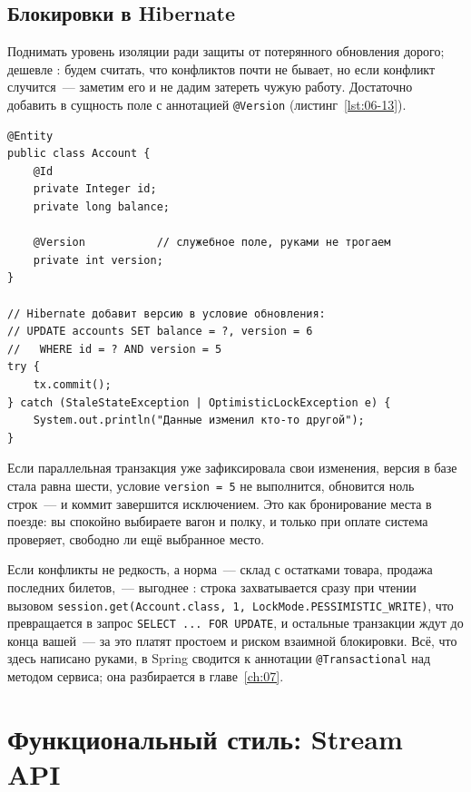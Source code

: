 \subsection{Блокировки в Hibernate}

Поднимать уровень изоляции ради защиты от потерянного обновления дорого;
дешевле : будем считать, что конфликтов почти
не бывает, но если конфликт случится~--- заметим его и не дадим затереть чужую
работу. Достаточно добавить в сущность поле с аннотацией \texttt{@Version}
(листинг~\ref{lst:06-13}).

\begin{listing}[H]
\begin{verbatim}
@Entity
public class Account {
    @Id
    private Integer id;
    private long balance;

    @Version           // служебное поле, руками не трогаем
    private int version;
}

// Hibernate добавит версию в условие обновления:
// UPDATE accounts SET balance = ?, version = 6
//   WHERE id = ? AND version = 5
try {
    tx.commit();
} catch (StaleStateException | OptimisticLockException e) {
    System.out.println("Данные изменил кто-то другой");
}
\end{verbatim}
\caption{Оптимистичная блокировка через версию строки}
\label{lst:06-13}
\end{listing}

Если параллельная транзакция уже зафиксировала свои изменения, версия в базе
стала равна шести, условие \texttt{version = 5} не выполнится, обновится ноль
строк~--- и коммит завершится исключением. Это как бронирование места в
поезде: вы спокойно выбираете вагон и полку, и только при оплате система
проверяет, свободно ли ещё выбранное место.

Если конфликты не редкость, а норма~--- склад с остатками товара, продажа
последних билетов,~--- выгоднее : строка
захватывается сразу при чтении вызовом
\texttt{session.get(Account.class, 1, LockMode.PESSIMISTIC\_WRITE)}, что
превращается в запрос \texttt{SELECT ... FOR UPDATE}, и остальные транзакции
ждут до конца вашей~--- за это платят простоем и риском взаимной блокировки.
Всё, что здесь написано руками, в Spring сводится к аннотации
\texttt{@Transactional} над методом сервиса; она разбирается в
главе~\ref{ch:07}.

\section{Функциональный стиль: Stream API}

